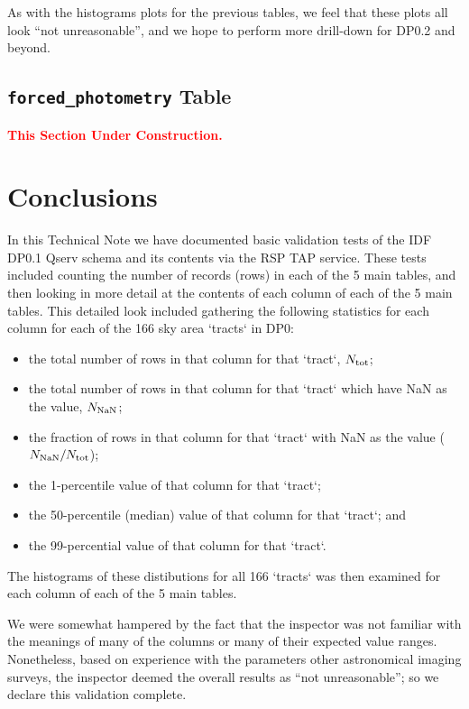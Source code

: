 \documentclass[DM,authoryear,toc]{lsstdoc}
\begin{document}
As with the histograms plots for the previous tables, we feel that
these plots all look ``not unreasonable'', and we hope to perform more
drill-down for DP0.2 and beyond.


\subsection{\texttt{forced\_photometry} Table} \label{sec:forced_photometry}


\textcolor{red}{\bf{This Section Under Construction.}}


\section{Conclusions} \label{sec:conclusions}

In this Technical Note we have documented basic validation tests of
the IDF DP0.1 Qserv schema and its contents via the RSP TAP service.
These tests included counting the number of records (rows) in each of
the 5 main tables, and then looking in more detail at the contents of
each column of each of the 5 main tables.  This detailed look included
gathering the following statistics for each column for each of the 166
sky area `tracts` in DP0:
\begin{itemize}
\item the total number of rows in that column for that `tract`, $N_{\rm tot}$;
\item the total number of rows in that column for that `tract` which have NaN as the value, $N_{\rm NaN}$;
\item the fraction of rows in that column for that `tract` with NaN as the value ($N_{\rm NaN} / N_{\rm tot}$);
\item the 1-percentile value of that column for that `tract`;
\item the 50-percentile (median) value of that column for that `tract`; and 
\item the 99-percential value of that column for that `tract`.
\end{itemize}
The histograms of these distibutions for all 166 `tracts` was then
examined for each column of each of the 5 main tables.

We were somewhat hampered by the fact that the inspector was not
familiar with the meanings of many of the columns or many of their
expected value ranges.  Nonetheless, based on experience with the
parameters other astronomical imaging surveys, the inspector deemed
the overall results as ``not unreasonable''; so we declare this
validation complete.
\end{document}
